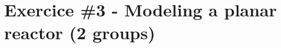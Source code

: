 \documentclass[11pt,a4paper]{article}
\begin{document}

\newpage
\section{Exercice \#3 - Modeling a planar reactor (2 groups)}
\end{document}
